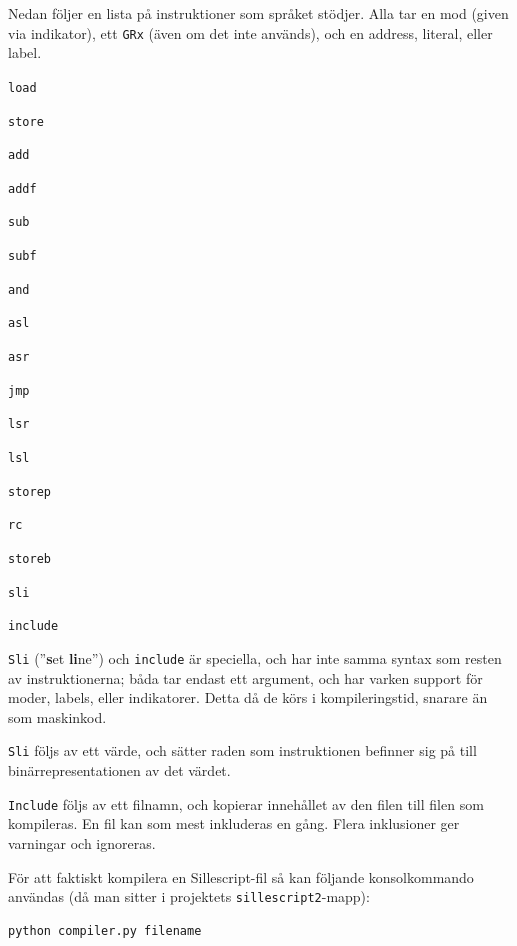 \documentclass[]{article}
\begin{document}
\noindent
Nedan följer en lista på instruktioner som språket stödjer. Alla tar en mod (given via indikator), ett \texttt{GRx} (även om det inte används), och en address, literal, eller label.

\begin{multicols}{3}
\begin{itemize*}
\item \texttt{load}
\item \texttt{store}
\item \texttt{add}
\item \texttt{addf}
\item \texttt{sub}
\item \texttt{subf}
\item \texttt{and}
\item \texttt{asl}
\item \texttt{asr}
\item \texttt{jmp}
\item \texttt{lsr}
\item \texttt{lsl}
\item \texttt{storep}
\item \texttt{rc}
\item \texttt{storeb}
\item \texttt{sli}
\item \texttt{include}
\end{itemize*}
\end{multicols}

\noindent
\texttt{Sli} (''\textbf{s}et \textbf{li}ne'') och \texttt{include} är speciella, och har inte samma syntax som resten av instruktionerna; båda tar endast ett argument, och har varken support för moder, labels, eller indikatorer. Detta då de körs i kompileringstid, snarare än som maskinkod.

\texttt{Sli} följs av ett värde, och sätter raden som instruktionen befinner sig på till binärrepresentationen av det värdet.

\texttt{Include} följs av ett filnamn, och kopierar innehållet av den filen till filen som kompileras. En fil kan som mest inkluderas en gång. Flera inklusioner ger varningar och ignoreras.

För att faktiskt kompilera en Sillescript-fil så kan följande konsolkommando användas (då man sitter i projektets \texttt{sillescript2}-mapp):\\

\begin{Verbatim}[frame=single]
python compiler.py filename
\end{Verbatim}
\end{document}
